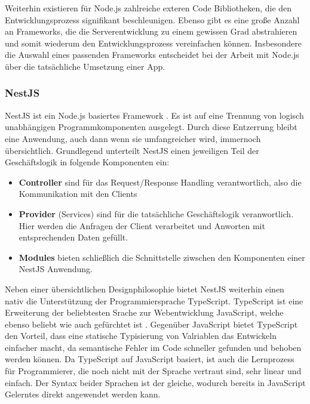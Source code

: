 Weiterhin existieren für Node.js zahlreiche exteren Code Bibliotheken, die den Entwicklungsprozess signifikant beschleunigen.
Ebenso gibt es eine große Anzahl an Frameworks, die die Serverentwicklung zu einem gewissen Grad abstrahieren und somit wiederum den Entwicklungsprozess vereinfachen können.
Insbesondere die Auswahl eines passenden Frameworks entscheidet bei der Arbeit mit Node.js über die tatsächliche Umsetzung einer App.

\subsubsection*{NestJS}
NestJS ist ein Node.js basiertes Framework \autocite{B_NestJs.}.
Es ist auf eine Trennung von logisch unabhängigen Programmkomponenten ausgelegt.
Durch diese Entzerrung bleibt eine Anwendung, auch dann wenn sie umfangreicher wird, immernoch übersichtlich.
Grundlegend unterteilt NestJS einen jeweiligen Teil der Geschäftslogik in folgende Komponenten ein:
\begin{itemize}
    \item \textbf{Controller} sind für das Request/Response Handling verantwortlich, also die Kommunikation mit den Clients
    \item \textbf{Provider} (Services) sind für die tatsächliche Geschäftslogik veranwortlich. Hier werden die Anfragen der Client verarbeitet und Anworten mit entsprechenden Daten gefüllt.
    \item \textbf{Modules} bieten schließlich die Schnittstelle ziwschen den Komponenten einer NestJS Anwendung.
\end{itemize}
Neben einer übersichtlichen Designphilosophie bietet NestJS weiterhin einen nativ die Unterstützung der Programmiersprache TypeScript.
TypeScript ist eine Erweiterung der beliebtesten Srache zur Webentwicklung JavaScript, welche ebenso beliebt wie auch gefürchtet ist \autocite{B_Stackoverflow.2020}.
Gegenüber JavaScript bietet TypeScript den Vorteil, dass eine statische Typisierung von Valriablen das Entwickeln einfacher macht, da semantische Fehler im Code schneller gefunden und behoben werden können.
Da TypeScript auf JavaScript basiert, ist auch die Lernprozess für Programmierer, die noch nicht mit der Sprache vertraut sind, sehr linear und einfach.
Der Syntax beider Sprachen ist der gleiche, wodurch bereits in JavaScript Gelerntes direkt angewendet werden kann.

